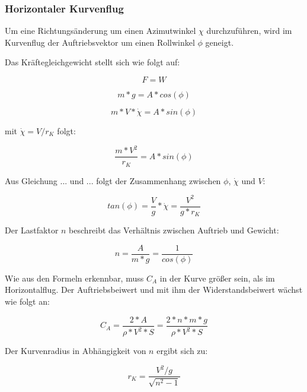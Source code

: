 \subsubsection{Horizontaler Kurvenflug}
\label{horizontalerkurvenflug}

Um eine Richtungsänderung um einen Azimutwinkel $\chi$ durchzuführen, wird im Kurvenflug der Auftriebsvektor um einen Rollwinkel $\phi$ geneigt.

Das Kräftegleichgewicht stellt sich wie folgt auf:

\begin{equation}
F = W
\end{equation}

\begin{equation}
m * g = A * cos(\phi)
\end{equation}

\begin{equation}
m * V * \dot{\chi} = A * sin(\phi)
\end{equation}

mit $\dot{\chi} = V / r_K$ folgt:

\begin{equation}
\frac{m * V^2}{r_K} = A * sin(\phi)
\end{equation}

Aus Gleichung ... und ... folgt der Zusammenhang zwischen $\phi$, $\dot{\chi}$ und $V$:

\begin{equation}
tan(\phi) = \frac{V}{g} * \dot{\chi} = \frac{V^2}{g * r_K}
\end{equation}

Der Lastfaktor $n$ beschreibt das Verhältnis zwischen Auftrieb und Gewicht:

\begin{equation}
n = \frac{A}{m * g} = \frac{1}{cos(\phi)}
\end{equation}

Wie aus den Formeln erkennbar, muss $C_A$ in der Kurve größer sein, als im Horizontalflug. Der Auftriebsbeiwert und mit ihm der Widerstandsbeiwert wächst wie folgt an:

\begin{equation}
C_A = \frac{2 * A}{\rho * V^2 * S} = \frac{2* n * m * g}{\rho * V^2 * S}
\end{equation}

Der Kurvenradius in Abhängigkeit von $n$ ergibt sich zu:

\begin{equation}
r_K = \frac{V^2 / g}{\sqrt{n^2 - 1}}
\end{equation}


